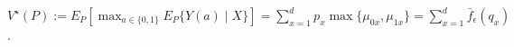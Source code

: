 \(V^\star(P):=E_P[\max_{a\in\{0,1\}}E_P\{Y(a)\mid X\}]=\sum_{x=1}^dp_x\max\{\mu_{0x},\mu_{1x}\}=\sum_{x=1}^d\bar f_\epsilon(q_x)\).